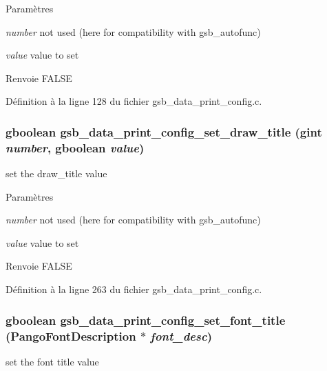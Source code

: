 \begin{DoxyParams}{Paramètres}
\item[{\em number}]not used (here for compatibility with gsb\_\-autofunc) \item[{\em value}]value to set\end{DoxyParams}
\begin{DoxyReturn}{Renvoie}
FALSE 
\end{DoxyReturn}


Définition à la ligne 128 du fichier gsb\_\-data\_\-print\_\-config.c.

\subsubsection[{gsb\_\-data\_\-print\_\-config\_\-set\_\-draw\_\-title}]{\setlength{\rightskip}{0pt plus 5cm}gboolean gsb\_\-data\_\-print\_\-config\_\-set\_\-draw\_\-title (gint {\em number}, \/  gboolean {\em value})}\label{gsb__data__print__config_8c_a8d6dcd2b99ea76bfb003da07439fee75}
set the draw\_\-title value


\begin{DoxyParams}{Paramètres}
\item[{\em number}]not used (here for compatibility with gsb\_\-autofunc) \item[{\em value}]value to set\end{DoxyParams}
\begin{DoxyReturn}{Renvoie}
FALSE 
\end{DoxyReturn}


Définition à la ligne 263 du fichier gsb\_\-data\_\-print\_\-config.c.

\subsubsection[{gsb\_\-data\_\-print\_\-config\_\-set\_\-font\_\-title}]{\setlength{\rightskip}{0pt plus 5cm}gboolean gsb\_\-data\_\-print\_\-config\_\-set\_\-font\_\-title (PangoFontDescription $\ast$ {\em font\_\-desc})}\label{gsb__data__print__config_8c_a2829de8cc372604bb83ad2f7e80e2ee6}
set the font title value


